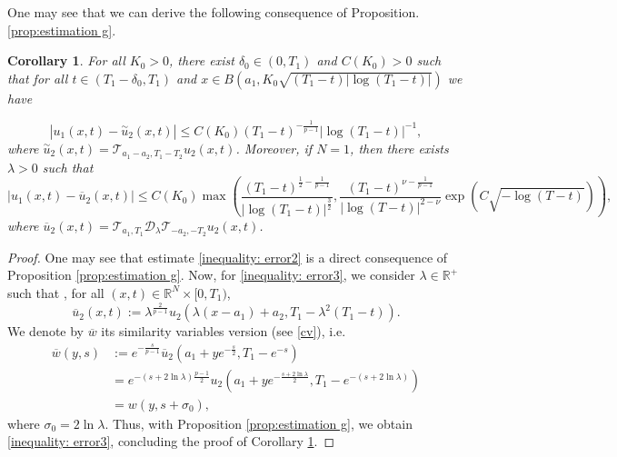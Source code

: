 \documentclass[11pt,a4paper]{article}
\newcommand{\1}{\mathbbm{1}}
\numberwithin{equation}{section}
\newcommand{\numberset}{\mathbb}
\newcommand{\R}{\numberset{R}}
\newtheorem{cor}[lemma]{Corollary}
\theoremstyle{remark}
\begin{document}
One may see that we can derive the following consequence of Proposition.\ref{prop:estimation g}.
\begin{cor}\label{cor: conclusion}
For all $K_0>0$, there exist $\delta_0\in (0,T_1)$ and $C(K_0)>0$ such that for all $t\in (T_1-\delta_0,T_1)$ and $x\in B(a_1,K_0\sqrt{(T_1-t)|\log(T_1-t)|})$ we have

\begin{equation}\label{inequality: error2}
|u_1(x,t)- \overset{\sim}{u}_2(x,t)| \leq C(K_0)(T_1-t)^{-\frac{1}{p-1}}|\log(T_1-t)|^{-1},
\end{equation}
where $\overset{\sim}{u}_2(x,t)=\mathcal{T}_{a_1-a_2,T_1-T_2}u_2(x,t)$. Moreover, if $N=1$, then there exists $\lambda>0$ such that
\begin{equation}\label{inequality: error3}
|u_1(x,t)-\overline{u}_2(x,t)|\leq C(K_0)\max\left(\frac{(T_1-t)^{\frac{1}{2}-\frac{1}{p-1}}}{|\log(T_1-t)|^{\frac{3}{2}}}, \frac{(T_1-t)^{\nu-\frac{1}{p-1}}}{|\log(T-t)|^{2-\nu}}\exp\left(C\sqrt{-\log(T-t)}\right)\right),
\end{equation}
where $ \overline{u}_2(x,t)=\mathcal{T}_{a_1,T_1}\mathcal{D}_{\lambda}\mathcal{T}_{-a_2,-T_2}u_2(x,t)$.
\end{cor}

\begin{proof}
One may see that estimate \eqref{inequality: error2} is a direct consequence of Proposition \ref{prop:estimation g}. Now, for \eqref{inequality: error3}, we consider $\lambda\in \R^+$ such that , for all $(x,t)\in \R^N\times[0,T_1)$,
$$\overline{u}_2(x,t):=\lambda^{\frac{2}{p-1}}u_2(\lambda(x-a_1)+a_2,T_1-\lambda^2(T_1-t)).$$
We denote by $\overline{w}$  its similarity variables version (see \eqref{cv}), i.e.
\begin{equation}
\begin{split}
\overline{w}(y,s)&:=e^{-\frac{s}{p-1}}\overline{u}_2(a_1+ye^{-\frac{s}{2}},T_1-e^{-s})\\
&=e^{-(s+2\ln\lambda)\frac{p-1}{2}}u_2(a_1+ye^{-\frac{s+2\ln\lambda}{2}},T_1-e^{-(s+2\ln\lambda )})\\
&=w(y,s+\sigma_0),
\end{split}
\end{equation}
where $\sigma_0=2\ln\lambda$. Thus, with Proposition \ref{prop:estimation g}, we obtain \eqref{inequality: error3}, concluding the proof of Corollary \ref{cor: conclusion}.
\end{proof}
\end{document}
